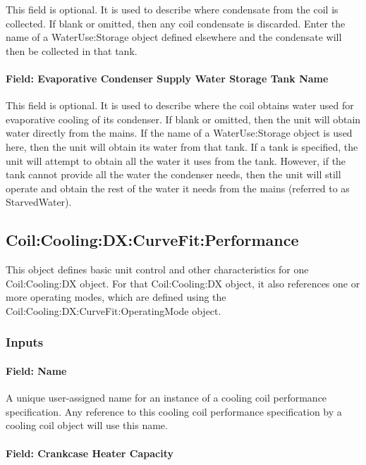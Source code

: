 This field is optional. It is used to describe where condensate from the coil is collected. If blank or omitted, then any coil condensate is discarded. Enter the name of a WaterUse:Storage object defined elsewhere and the condensate will then be collected in that tank.

\paragraph{Field: Evaporative Condenser Supply Water Storage Tank Name}\label{field-evaporative-condenser-supply-water-storage-tank-name-000}

This field is optional. It is used to describe where the coil obtains water used for evaporative cooling of its condenser. If blank or omitted, then the unit will obtain water directly from the mains. If the name of a WaterUse:Storage object is used here, then the unit will obtain its water from that tank. If a tank is specified, the unit will attempt to obtain all the water it uses from the tank. However, if the tank cannot provide all the water the condenser needs, then the unit will still operate and obtain the rest of the water it needs from the mains (referred to as StarvedWater).

\subsection{Coil:Cooling:DX:CurveFit:Performance}\label{coilcoolingdxcurvefitperformance}

This object defines basic unit control and other characteristics for one Coil:Cooling:DX object. For that Coil:Cooling:DX object, it also references one or more operating modes, which are defined using the Coil:Cooling:DX:CurveFit:OperatingMode object.

\subsubsection{Inputs}\label{inputs-02}

\paragraph{Field: Name}\label{field-name-02}

A unique user-assigned name for an instance of a cooling coil performance specification. Any reference to this cooling coil performance specification by a cooling coil object will use this name.

\paragraph{Field: Crankcase Heater Capacity}

